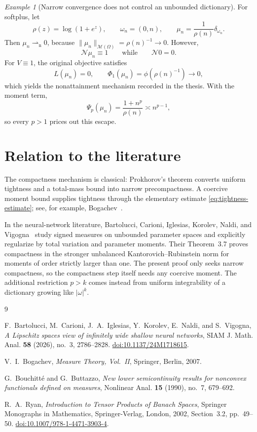 \documentclass[11pt]{amsart}
\theoremstyle{definition}
\theoremstyle{remark}
\newtheorem{example}[theorem]{Example}
\newcommand{\M}{\mathcal{M}}
\newcommand{\N}{\mathcal{N}}
\newcommand{\weakn}{\rightharpoonup_{\mathrm n}}
\begin{document}
\begin{example}[Narrow convergence does not control an unbounded dictionary]
For softplus, let
\[
  \rho(z)=\log(1+e^z),\qquad
  \omega_n=(0,n),\qquad
  \mu_n=\frac{1}{\rho(n)}\delta_{\omega_n}.
\]
Then $\mu_n\weakn0$, because
$\|\mu_n\|_{\M(\Omega)}=\rho(n)^{-1}\to0$.  However,
\[
  \N\mu_n\equiv1
  \qquad\text{while}\qquad
  \N0=0.
\]
For $V\equiv1$, the original objective satisfies
\[
  L(\mu_n)=0,\qquad
  \Phi_1(\mu_n)=\phi(\rho(n)^{-1})\longrightarrow0,
\]
which yields the nonattainment mechanism recorded in the thesis.  With the
moment term,
\[
  \Psi_p(\mu_n)
  =
  \frac{1+n^p}{\rho(n)}
  \asymp n^{p-1},
\]
so every $p>1$ prices out this escape.
\end{example}

\section{Relation to the literature}

The compactness mechanism is classical: Prokhorov's theorem converts uniform
tightness and a total-mass bound into narrow precompactness.  A coercive moment
bound supplies tightness through the elementary estimate
\eqref{eq:tightness-estimate}; see, for example,
Bogachev~\cite{bogachev-measure}.

In the neural-network literature, Bartolucci, Carioni, Iglesias, Korolev,
Naldi, and Vigogna~\cite{bartolucci-et-al} study signed measures on unbounded
parameter spaces and explicitly regularize by total variation and parameter
moments.  Their Theorem~3.7 proves compactness in the stronger unbalanced
Kantorovich--Rubinstein norm for moments of order strictly larger than one.
The present proof only seeks narrow compactness, so the compactness step itself
needs any coercive moment.  The additional restriction $p>k$ comes instead
from uniform integrability of a dictionary growing like $|\omega|^k$.

\begin{thebibliography}{9}

F.~Bartolucci, M.~Carioni, J.~A.~Iglesias, Y.~Korolev, E.~Naldi, and
S.~Vigogna,
\emph{A Lipschitz spaces view of infinitely wide shallow neural networks},
SIAM J. Math. Anal. \textbf{58} (2026), no.~3, 2786--2828.
\href{https://doi.org/10.1137/24M1718615}{doi:10.1137/24M1718615}.

V.~I.~Bogachev,
\emph{Measure Theory, Vol.~II},
Springer, Berlin, 2007.

G.~Bouchitt\'e and G.~Buttazzo,
\emph{New lower semicontinuity results for nonconvex functionals defined on
measures},
Nonlinear Anal. \textbf{15} (1990), no.~7, 679--692.

R.~A.~Ryan,
\emph{Introduction to Tensor Products of Banach Spaces},
Springer Monographs in Mathematics,
Springer-Verlag, London, 2002, Section~3.2, pp.~49--50.
\href{https://doi.org/10.1007/978-1-4471-3903-4}
{doi:10.1007/978-1-4471-3903-4}.

\end{thebibliography}
\end{document}
